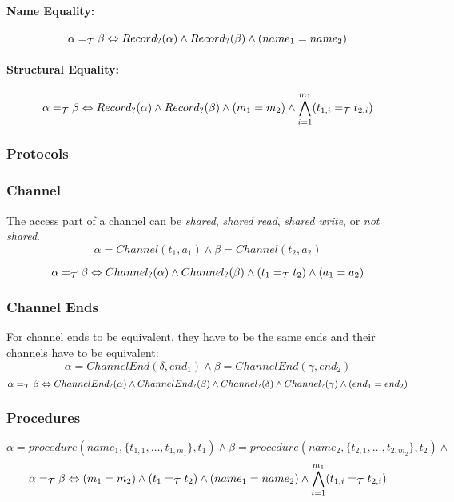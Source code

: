 \documentclass[]{article}
\begin{document}
\paragraph{Name Equality:}
\[
\alpha =_{\cal T} \beta \Leftrightarrow Record_?(\alpha) \wedge Record_?(\beta) \wedge (name_1 = name_2)
\]
\paragraph{Structural Equality:}
\[
\alpha =_{\cal T} \beta \Leftrightarrow Record_?(\alpha) \wedge Record_?(\beta) \wedge (m_1 = m_2) \wedge \bigwedge^{m_1}_{i=1} (t_{1,i} =_{\cal T} t_{2,i})
\]
	
\subsubsection{Protocols}

\subsubsection{Channel}

The access part of a channel can be {\it shared}, {\it shared read}, {\it shared write}, or {\it not shared}. 
\
\[
\alpha = Channel(t_1, a_1) \wedge \beta = Channel(t_2, a_2)\]

\[
\alpha =_{\cal T} \beta \Leftrightarrow Channel_?(\alpha) \wedge Channel_?(\beta) \wedge (t_1 =_{\cal T} t_2) \wedge (a_1 = a_2)
\]

\subsubsection{Channel Ends}

For channel ends to be equivalent, they have to be the same ends and their channels have to be equivalent:
\[
\alpha = ChannelEnd(\delta, end_1) \wedge \beta = ChannelEnd(\gamma, end_2)
\]
\[
\alpha =_{\cal T} \beta \Leftrightarrow ChannelEnd_?(\alpha) \wedge ChannelEnd_?(\beta) \wedge Channel_?(\delta) \wedge Channel_?(\gamma) \wedge (end_1 = end_2)
\]

\subsubsection{Procedures}

\[
\alpha = procedure(name_1, \{t_{1,1},\ldots,t_{1,m_1}\}, t_1) \wedge
\beta = procedure(name_2, \{t_{2,1},\ldots,t_{2,m_2}\}, t_2) \wedge
\]
\[
\alpha =_{\cal T} \beta \Leftrightarrow (m_1 = m_2) \wedge (t_1 =_{\cal T} t_2) \wedge (name_1 = name_2) \wedge \bigwedge^{m_1}_{i=1}(t_{1,i} =_{\cal T} t_{2,i})
\]
\end{document}
